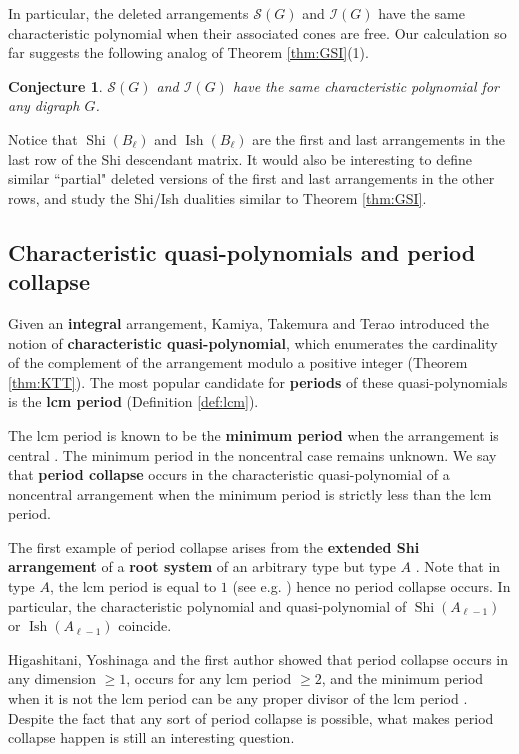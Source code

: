 \documentclass[11pt]{article}
\newtheorem{conjecture}[theo]{Conjecture}
\theoremstyle{definition}
\numberwithin{equation}{section}
\DeclareMathOperator{\Shi}{Shi}
\DeclareMathOperator{\Ish}{Ish}
\newcommand{\mcS}{\mathcal{S}}
\newcommand{\I}{\mathcal{I}}
\newcommand{\tbf}{\textbf}
\begin{document}
 In particular, the deleted arrangements $\mcS(G)$ and $\I(G)$ have the same characteristic polynomial when their associated cones are free. 
 Our calculation so far suggests the following analog of Theorem \ref{thm:GSI}(1). 
 \begin{conjecture}
\label{conj:same-CP}
 $\mcS(G)$ and $\I(G)$ have the same characteristic polynomial for any digraph $G$.
 \end{conjecture}
 
 Notice that $\Shi(B_{\ell})$ and $\Ish(B_{\ell})$ are the first and last arrangements in the last row of the Shi descendant matrix. 
 It would also be interesting to define similar  ``partial" deleted versions of the first and last arrangements in the other rows, and study the Shi/Ish dualities similar to  Theorem \ref{thm:GSI}.


\subsection{Characteristic quasi-polynomials and period collapse}
\label{subsec:period collapse}

Given an \tbf{integral} arrangement, Kamiya, Takemura and Terao \cite{KTT08, KTT11} introduced the notion of \tbf{characteristic quasi-polynomial}, which enumerates the cardinality of the complement of the arrangement modulo a positive integer (Theorem \ref{thm:KTT}). 
The most popular candidate for \tbf{periods} of these quasi-polynomials is the \tbf{lcm period} (Definition \ref{def:lcm}). 

The lcm period is known to be the \tbf{minimum period} when the arrangement is central \cite[Theorem 1.2]{HTY23}. 
The minimum period in the noncentral case remains unknown. 
We say that \tbf{period collapse} occurs in the characteristic quasi-polynomial of a noncentral arrangement when the minimum period is strictly less than the lcm period. 


The first example of period collapse arises from the \tbf{extended Shi arrangement} of a \tbf{root system} of an arbitrary type but type $A$ \cite[Theorem 5.1]{Y18W}. 
Note that in type $A$, the lcm period is equal to $1$ (see e.g. \cite[Corollary 3.2]{KTT10}) hence no period collapse occurs. 
In particular, the characteristic polynomial and quasi-polynomial of $\Shi(A_{\ell-1}) $ or $\Ish(A_{\ell-1}) $ coincide.  

Higashitani, Yoshinaga and the first author showed that period collapse occurs in any dimension $\ge 1$, occurs for any lcm period $\ge 2$, and the minimum period when it is not the lcm period can be any proper divisor of the lcm period \cite[Theorem 1.2]{HTY23}. 
Despite the fact that any sort of period collapse is possible, what makes period collapse happen is still an interesting question.
\end{document}
